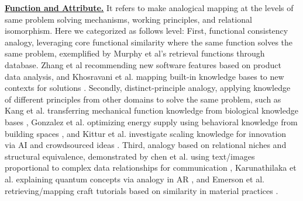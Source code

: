 \textbf{\underline{Function and Attribute.}} It refers to make analogical mapping at the levels of same problem solving mechanisms, working principles, and relational isomorphism. Here we categorized as follows level: First, functional consistency analogy, leveraging core functional similarity where the same function solves the same problem, exemplified by Murphy et al's retrieval functions through database\cite{murphy2014function}. Zhang et al recommending new software features based on product data analysis\cite{zhang2017systematic}, and Khosravani et al. mapping built-in knowledge bases to new contexts for solutions \cite{khosravani2022intelligent}. Secondly, distinct-principle analogy, applying knowledge of different principles from other domains to solve the same problem, such as Kang et al. transferring mechanical function knowledge from biological knowledge bases \cite{kang2025biospark}, Gonzalez et al. optimizing energy supply using behavioral knowledge from building spaces \cite{gonzalez2018energy}, and Kittur et al. investigate scaling knowledge for innovation via AI and crowdsourced ideas \cite{kittur2019scaling}. Third, analogy based on relational niches and structural equivalence, demonstrated by chen et al. using text/images proportional to complex data relationships for communication \cite{chen2024beyond}, Karunathilaka et al. explaining quantum concepts via analogy in AR \cite{karunathilaka2025intuit}, and Emerson et al. retrieving/mapping craft tutorials based on similarity in material practices \cite{emerson2024anther}.






